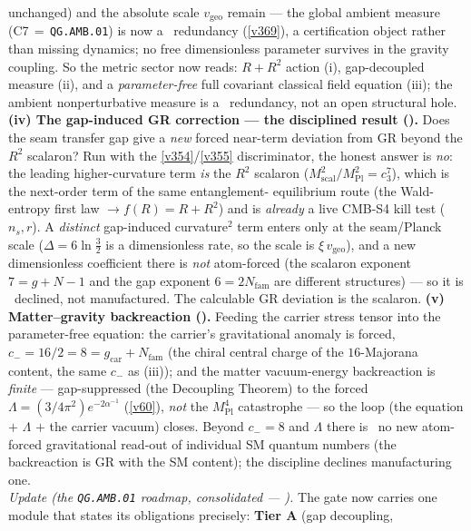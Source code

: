 \documentclass[11pt,a4paper]{article}
\newcommand{\cthree}{c_3}
\newcommand{\Mpl}{M_{\mathrm{Pl}}}
\newcommand{\Nfam}{N_{\mathrm{fam}}}
\begin{document}
\begin{keybox}
unchanged) and the absolute scale
$v_{\mathrm{geo}}$ remain \mO --- the global ambient measure (C7\,$=$\,\texttt{QG.AMB.01}) is now a \mC\ redundancy
(\vref{v369}), a certification object rather than missing dynamics; no free dimensionless parameter survives in the
gravity coupling. So the metric sector now reads: $R{+}R^2$ action (i), gap-decoupled measure (ii), and a
\emph{parameter-free} full covariant classical field equation (iii); the ambient nonperturbative measure is a
\mC\ redundancy, not an open structural hole.
\textbf{(iv) The gap-induced GR correction --- the disciplined result ().} Does
the seam transfer gap give a \emph{new} forced near-term deviation from GR beyond the $R^2$ scalaron? Run with the
\vref{v354}/\vref{v355} discriminator, the honest answer is \emph{no}: the leading higher-curvature term \emph{is}
the $R^2$ scalaron ($M_{\mathrm{scal}}^2/\Mpl^2=\cthree^7$), which is the next-order term of the same entanglement-
equilibrium route (the Wald-entropy first law $\to f(R){=}R{+}R^2$) and is \emph{already} a live CMB-S4 kill test
($n_s,r$). A \emph{distinct} gap-induced curvature$^2$ term enters only at the seam/Planck scale ($\Delta=6\ln\tfrac32$
is a dimensionless rate, so the scale is $\xi\,v_{\mathrm{geo}}$), and a new dimensionless coefficient there is
\emph{not} atom-forced (the scalaron exponent $7{=}g{+}N{-}1$ and the gap exponent $6{=}2\Nfam$ are different
structures) --- so it is \mO\ declined, not manufactured. The calculable GR deviation is the scalaron.
\textbf{(v) Matter--gravity backreaction ().} Feeding the carrier stress tensor into
the parameter-free equation: the carrier's gravitational anomaly is forced, $c_-=16/2=8=g_{\mathrm{car}}{+}\Nfam$ (the
chiral central charge of the $16$-Majorana content, the same $c_-$ as (iii)); and the matter vacuum-energy
backreaction is \emph{finite} --- gap-suppressed (the Decoupling Theorem) to the forced $\Lambda=(3/4\pi^2)
e^{-2\alpha^{-1}}$ (\vref{v60}), \emph{not} the $M_{\mathrm{Pl}}^4$ catastrophe --- so the loop (the equation $+$
$\Lambda$ $+$ the carrier vacuum) closes. Beyond $c_-{=}8$ and $\Lambda$ there is \mO\ no new atom-forced
gravitational read-out of individual SM quantum numbers (the backreaction is GR with the SM content); the discipline
declines manufacturing one.
\smallskip\\
\noindent\emph{Update (the \texttt{QG.AMB.01} roadmap, consolidated --- ).} The
gate now carries one module that states its obligations precisely: \textbf{Tier A} (gap decoupling,

\end{keybox}
\end{document}
